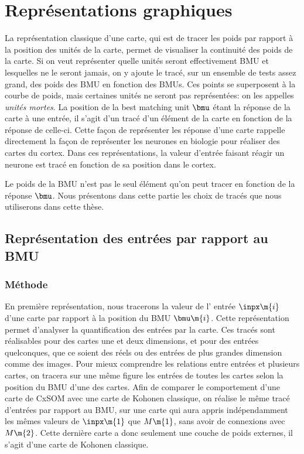 \section{Représentations graphiques}

La représentation classique d'une carte, qui est de tracer les poids par rapport à la position des unités de la carte, permet de visualiser la continuité des poids de la carte. 
Si on veut représenter quelle unités seront effectivement BMU et lesquelles ne le seront jamais, on y ajoute le tracé, sur un ensemble de tests assez grand, des poids des BMU en fonction des BMUs. Ces points se superposent à la courbe de poids, mais certaines unités ne seront pas représentées: on les appelles \emph{unités mortes}. La position de la best matching unit $\bmu$ étant la réponse de la carte à une entrée, il s'agit d'un tracé d'un élément de la carte en fonction de la réponse de celle-ci. 
Cette façon de représenter les réponse d'une carte rappelle directement la façon de représenter les neurones en biologie pour réaliser des cartes du cortex. Dans ces représentations, la valeur d'entrée faisant réagir un neurone est tracé en fonction de sa position dans le cortex.

Le poids de la BMU n'est pas le seul élément qu'on peut tracer en fonction de la réponse $\bmu$. Nous présentons dans cette partie les choix de tracés que nous utiliserons dans cette thèse.

\subsection{Représentation des entrées par rapport au BMU}

\subsubsection{Méthode}
En première représentation, nous tracerons la valeur de l' entrée $\inpx\m{i}$ d'une carte par rapport à la position du BMU $\bmu\m{i}$. Cette représentation permet d'analyser la quantification des entrées par la carte. Ces tracés sont réalisables pour des cartes une et deux dimensions, et pour des entrées quelconques, que ce soient des réels ou des entrées de plus grandes dimension comme des images.
Pour mieux comprendre les relations entre entrées et plusieurs cartes, on tracera sur une même figure les entrées de toutes les cartes selon la position du BMU d'une des cartes. Afin de comparer le comportement d'une carte de CxSOM avec une carte de Kohonen classique, on réalise le même tracé d'entrées par rapport au BMU, sur une carte qui aura appris indépendamment les mêmes valeurs de $\inpx\m{1}$ que $M\m{1}$, sans avoir de connexions avec $M\m{2}$. Cette dernière carte a donc seulement une couche de poids externes, il s'agit d'une carte de Kohonen classique.

